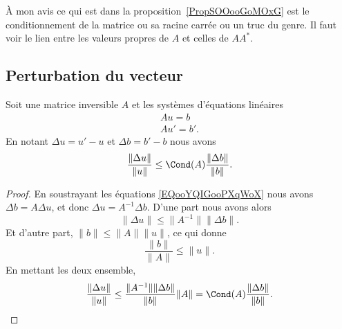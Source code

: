 \begin{probleme}
    À mon avis ce qui est dans la proposition~\ref{PropSOOooGoMOxG} est le conditionnement de la matrice ou sa racine carrée ou un truc du genre. Il faut voir le lien entre les valeurs propres de \( A\) et celles de \( AA^*\).
\end{probleme}

\subsection{Perturbation du vecteur}

\begin{proposition}        \label{PROPooGIXFooAhJkIs}
    Soit une matrice inversible \( A\) et les systèmes d'équations linéaires
    \begin{subequations}        \label{EQooYQIGooPXqWoX}
        \begin{align}
            Au=b\\
            Au'=b'.
        \end{align}
    \end{subequations}
    En notant \( \Delta u=u'-u\) et \( \Delta b=b'-b\) nous avons
    \begin{equation}        \label{EQooESXRooMYuvRa}
        \frac{ \| \Delta u \| }{ \| u \| }\leq \Cond(A)\frac{ \| \Delta b \| }{ \| b \| }.
    \end{equation}
\end{proposition}

\begin{proof}
    En soustrayant les équations \eqref{EQooYQIGooPXqWoX} nous avons \( \Delta b=A\Delta u\), et donc \( \Delta u=A^{-1} \Delta b\). D'une part nous avons alors
    \begin{equation}
        \| \Delta u \|\leq \| A^{-1} \|\| \Delta b \|.
    \end{equation}
    Et d'autre part, \( \| b \|\leq \| A \|\| u \|\), ce qui donne
    \begin{equation}
        \frac{ \| b \| }{ \| A \| }\leq \| u \|.
    \end{equation}
    En mettant les deux ensemble,
    \begin{equation}
        \frac{ \| \Delta u \| }{ \| u \| }\leq \frac{ \| A^{-1} \|\| \Delta b \| }{ \| b \| }\| A \|=\Cond(A)\frac{ \| \Delta b \| }{ \| b \| }.
    \end{equation}
\end{proof}


